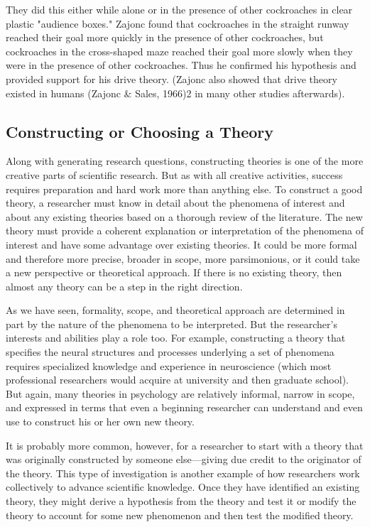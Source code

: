 They did this either while alone or in the presence of other cockroaches in clear plastic "audience boxes." Zajonc found that cockroaches in the straight runway reached their goal more quickly in the presence of other cockroaches, but cockroaches in the cross-shaped maze reached their goal more slowly when they were in the presence of other cockroaches. Thus he confirmed his hypothesis and provided support for his drive theory. (Zajonc also showed that drive theory existed in humans (Zajonc \& Sales, 1966)2 in many other studies afterwards).

\subsection{Constructing or Choosing a Theory}


Along with generating research questions, constructing theories is one of the more creative parts of scientific research. But as with all creative activities, success requires preparation and hard work more than anything else. To construct a good theory, a researcher must know in detail about the phenomena of interest and about any existing theories based on a thorough review of the literature. The new theory must provide a coherent explanation or interpretation of the phenomena of interest and have some advantage over existing theories. It could be more formal and therefore more precise, broader in scope, more parsimonious, or it could take a new perspective or theoretical approach. If there is no existing theory, then almost any theory can be a step in the right direction.


As we have seen, formality, scope, and theoretical approach are determined in part by the nature of the phenomena to be interpreted. But the researcher's interests and abilities play a role too. For example, constructing a theory that specifies the neural structures and processes underlying a set of phenomena requires specialized knowledge and experience in neuroscience (which most professional researchers would acquire at university and then graduate school). But again, many theories in psychology are relatively informal, narrow in scope, and expressed in terms that even a beginning researcher can understand and even use to construct his or her own new theory.

It is probably more common, however, for a researcher to start with a theory that was originally constructed by someone else---giving due credit to the originator of the theory. This type of investigation is another example of how researchers work collectively to advance scientific knowledge. Once they have identified an existing theory, they might derive a hypothesis from the theory and test it or modify the theory to account for some new phenomenon and then test the modified theory.


